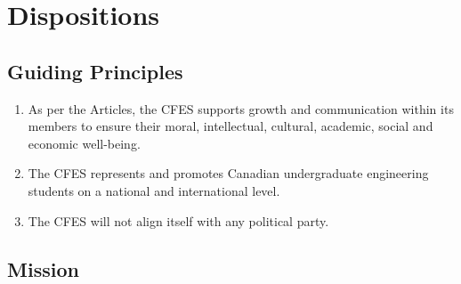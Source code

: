 \section{Dispositions}
\label{dispositions}

\subsection{Guiding Principles}
\label{dispositions-guiding-principles}

\begin{enumerate}
 \item As per the Articles, the CFES supports growth and communication within its members to ensure their moral, intellectual, cultural, academic, social and economic well-being.
 \item The CFES represents and promotes Canadian undergraduate engineering students on a national and international level.
 \item The CFES will not align itself with any political party.
\end{enumerate}

\subsection{Mission}
\label{dispositions-mission}

